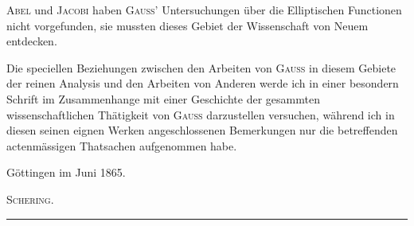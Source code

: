\textsc{Abel} und \textsc{Jacobi} haben \textsc{Gauss}’ Untersuchungen über die Elliptischen Functionen nicht vorgefunden, sie mussten dieses Gebiet der Wissenschaft von Neuem entdecken.

Die speciellen Beziehungen zwischen den Arbeiten von \textsc{Gauss} in diesem Gebiete der reinen Analysis und den Arbeiten von Anderen werde ich in einer besondern Schrift im Zusammenhange mit einer Geschichte der gesammten wissenschaftlichen Thätigkeit von \textsc{Gauss} darzustellen versuchen, während ich in diesen seinen eignen Werken angeschlossenen Bemerkungen nur die betreffenden actenmässigen Thatsachen aufgenommen habe.

\par Göttingen im Juni 1865.
\begin{flushright}
\textsc{Schering}.
\end{flushright}
\begin{center}
\rule{0.27\linewidth}{0.2pt}
\end{center}

\clearpage{}


